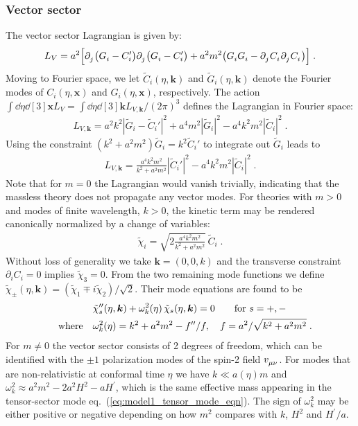 \documentclass[11pt,a4paper]{article}
\newcommand{\ba}[1]{\begin{align} #1 \end{align}}
\newcommand{\bes}[1]{\begin{equation}\begin{split} #1 \end{split}\end{equation}}
\newcommand{\kvec}{{\bm k}}
\newcommand{\xvec}{{\bm x}}
\newcommand{\LV}{L_V}
\newcommand{\LVk}{L_{V,\kvec}}
\newcommand{\eref}[1]{eq.~(\ref{#1})}
\begin{document}
\subsubsection{Vector sector}
\label{sub:model1_vector_sector}

The vector sector Lagrangian is given by:
\ba{\label{eq:model1_LV}
    \LV = a^2 \Big[ \partial\indices{_j}\bigl( G\indices{_i} - C_i' \bigr) \partial\indices{_j} \bigl( G\indices{_i} - C_i' \bigr)
    + a^2 m^2 \bigl( G\indices{_i}G\indices{_i} - \partial\indices{_j}C\indices{_i}\partial\indices{_j}C\indices{_i} \bigr) \Big] 
    \;.
}
Moving to Fourier space, we let $\tilde{C}_i(\eta, \kvec)$ and $\tilde{G}_i(\eta, \kvec)$ denote the Fourier modes of $C_i(\eta, \xvec)$ and $G_i(\eta, \xvec)$, respectively. The action $\int \! \dd\eta \dd[3]{\xvec} \LV = \int \! \dd\eta \dd[3]{\kvec} \LVk / (2\pi)^3$ defines the Lagrangian in Fourier space: 
\ba{
    \LVk = a^2 k^2 | \tilde{G}_i - \tilde{C}_i' |^2 + a^4 m^2 | \tilde{G}_i |^2 - a^4 k^2 m^2 | \tilde{C}_i |^2 
    \;.
}
Using the constraint $(k^2 + a^2 m^2) \tilde{G}_i = k^2 \tilde{C}_i'$ to integrate out $\tilde{G}_i$ leads to 
\ba{\label{eq:model1_LVk}
    \LVk = \frac{a^4 k^2 m^2}{k^2 + a^2 m^2} | {\tilde C}_i' |^2 - a^4 k^2 m^2 | {\tilde C}_i |^2
    \;.
}
Note that for $m = 0$ the Lagrangian would vanish trivially, indicating that the massless theory does not propagate any vector modes.  For theories with $m > 0$ and modes of finite wavelength, $k > 0$, the kinetic term may be rendered canonically normalized by a change of variables:
\ba{\label{eq:model1_C_to_chi}
    \tilde{\chi}_i = \sqrt{2\frac{a^4 k^2 m^2}{k^2 + a^2 m^2}} \, \tilde{C}_i 
    \;.
}
Without loss of generality we take $\kvec = (0,0,k)$ and the transverse constraint $\partial_i C_i = 0$ implies $\tilde{\chi}_3 = 0$.  From the two remaining mode functions we define $\tilde{\chi}_{\pm}(\eta, \kvec) = (\tilde{\chi}_1 \mp i \tilde{\chi}_2) / \sqrt{2}$.  Their mode equations are found to be
\bes{\label{eq:model1_vector_mode_eqn}
    & \tilde{\chi}_s^{\prime\prime}(\eta,\kvec) + \omega_k^2(\eta) \, \tilde{\chi}_s(\eta,\kvec) = 0 \qquad \text{for $s = +,-$} \\
    \qq{where} & \omega_k^2(\eta) = k^2 + a^2 m^2 - f^{\prime\prime}/f,\quad
    f = a^2 / \sqrt{k^2 + a^2 m^2}
    \;.
}
For $m \neq 0$ the vector sector consists of 2 degrees of freedom, which can be identified with the $\pm 1$ polarization modes of the spin-2 field $v\indices{_\mu_\nu}$.  For modes that are non-relativistic at conformal time $\eta$ we have $k \ll a(\eta) m$ and $\omega_k^2 \approx a^2 m^2 - 2 a^2 H^2 - a H^\prime$, which is the same effective mass appearing in the tensor-sector mode \eref{eq:model1_tensor_mode_eqn}.  The sign of $\omega_k^2$ may be either positive or negative depending on how $m^2$ compares with $k$, $H^2$ and $H^\prime/a$.
\end{document}
